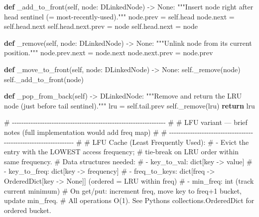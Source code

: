 \documentclass[11pt]{article}
\newenvironment{Shaded}{\begin{snugshade}}{\end{snugshade}}
\newcommand{\BuiltInTok}[1]{\textcolor[rgb]{0.50,0.55,0.55}{#1}}
\newcommand{\CommentTok}[1]{\textcolor[rgb]{0.48,0.49,0.49}{#1}}
\newcommand{\ControlFlowTok}[1]{\textcolor[rgb]{0.99,0.74,0.29}{\textbf{#1}}}
\newcommand{\KeywordTok}[1]{\textcolor[rgb]{0.81,0.81,0.76}{\textbf{#1}}}
\newcommand{\NormalTok}[1]{\textcolor[rgb]{0.81,0.81,0.76}{#1}}
\newcommand{\OperatorTok}[1]{\textcolor[rgb]{0.81,0.81,0.76}{#1}}
\newcommand{\VariableTok}[1]{\textcolor[rgb]{0.15,0.68,0.68}{#1}}
\begin{document}
\begin{Shaded}
\begin{Highlighting}[]
    \KeywordTok{def}\NormalTok{ \_add\_to\_front(}\VariableTok{self}\NormalTok{, node: DLinkedNode) }\OperatorTok{{-}\textgreater{}} \VariableTok{None}\NormalTok{:}
        \CommentTok{"""Insert node right after head sentinel (= most{-}recently{-}used)."""}
\NormalTok{        node.prev }\OperatorTok{=} \VariableTok{self}\NormalTok{.head}
\NormalTok{        node.}\BuiltInTok{next} \OperatorTok{=} \VariableTok{self}\NormalTok{.head.}\BuiltInTok{next}
        \VariableTok{self}\NormalTok{.head.}\BuiltInTok{next}\NormalTok{.prev }\OperatorTok{=}\NormalTok{ node}
        \VariableTok{self}\NormalTok{.head.}\BuiltInTok{next} \OperatorTok{=}\NormalTok{ node}

    \KeywordTok{def}\NormalTok{ \_remove(}\VariableTok{self}\NormalTok{, node: DLinkedNode) }\OperatorTok{{-}\textgreater{}} \VariableTok{None}\NormalTok{:}
        \CommentTok{"""Unlink node from its current position."""}
\NormalTok{        node.prev.}\BuiltInTok{next} \OperatorTok{=}\NormalTok{ node.}\BuiltInTok{next}
\NormalTok{        node.}\BuiltInTok{next}\NormalTok{.prev }\OperatorTok{=}\NormalTok{ node.prev}

    \KeywordTok{def}\NormalTok{ \_move\_to\_front(}\VariableTok{self}\NormalTok{, node: DLinkedNode) }\OperatorTok{{-}\textgreater{}} \VariableTok{None}\NormalTok{:}
        \VariableTok{self}\NormalTok{.\_remove(node)}
        \VariableTok{self}\NormalTok{.\_add\_to\_front(node)}

    \KeywordTok{def}\NormalTok{ \_pop\_from\_back(}\VariableTok{self}\NormalTok{) }\OperatorTok{{-}\textgreater{}}\NormalTok{ DLinkedNode:}
        \CommentTok{"""Remove and return the LRU node (just before tail sentinel)."""}
\NormalTok{        lru }\OperatorTok{=} \VariableTok{self}\NormalTok{.tail.prev}
        \VariableTok{self}\NormalTok{.\_remove(lru)}
        \ControlFlowTok{return}\NormalTok{ lru}


\CommentTok{\# {-}{-}{-}{-}{-}{-}{-}{-}{-}{-}{-}{-}{-}{-}{-}{-}{-}{-}{-}{-}{-}{-}{-}{-}{-}{-}{-}{-}{-}{-}{-}{-}{-}{-}{-}{-}{-}{-}{-}{-}{-}{-}{-}{-}{-}{-}{-}{-}{-}{-}{-}{-}{-}{-}{-}{-}{-}{-}{-}{-}{-}{-}{-}{-}{-}{-} \#}
\CommentTok{\# LFU variant — brief notes (full implementation would add freq map) \#}
\CommentTok{\# {-}{-}{-}{-}{-}{-}{-}{-}{-}{-}{-}{-}{-}{-}{-}{-}{-}{-}{-}{-}{-}{-}{-}{-}{-}{-}{-}{-}{-}{-}{-}{-}{-}{-}{-}{-}{-}{-}{-}{-}{-}{-}{-}{-}{-}{-}{-}{-}{-}{-}{-}{-}{-}{-}{-}{-}{-}{-}{-}{-}{-}{-}{-}{-}{-}{-} \#}
\CommentTok{\# LFU Cache (Least Frequently Used):}
\CommentTok{\#   {-} Evict the entry with the LOWEST access frequency;}
\CommentTok{\#     tie{-}break on LRU order within same frequency.}
\CommentTok{\# Data structures needed:}
\CommentTok{\#   {-} key\_to\_val: dict[key {-}\textgreater{} value]}
\CommentTok{\#   {-} key\_to\_freq: dict[key {-}\textgreater{} frequency]}
\CommentTok{\#   {-} freq\_to\_keys: dict[freq {-}\textgreater{} OrderedDict[key {-}\textgreater{} None]]  (ordered = LRU within freq)}
\CommentTok{\#   {-} min\_freq: int  (track current minimum)}
\CommentTok{\# On get/put: increment freq, move key to freq+1 bucket, update min\_freq.}
\CommentTok{\# All operations O(1). See Python\textquotesingle{}s collections.OrderedDict for ordered bucket.}



\end{Highlighting}
\end{Shaded}
\end{document}
